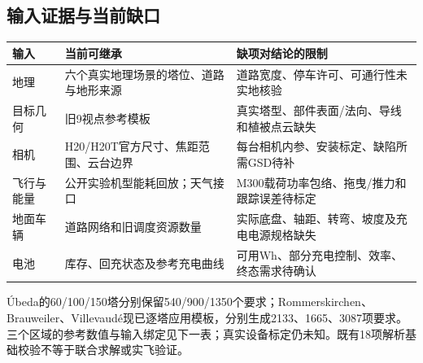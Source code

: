 \subsection{输入证据与当前缺口}
\begin{center}\small
\begin{tabular}{p{.24\linewidth}p{.35\linewidth}p{.31\linewidth}}\toprule
输入 & 当前可继承 & 缺项对结论的限制\\\midrule
地理 & 六个真实地理场景的塔位、道路与地形来源 & 道路宽度、停车许可、可通行性未实地核验\\
目标几何 & 旧9视点参考模板 & 真实塔型、部件表面/法向、导线和植被点云缺失\\
相机 & H20/H20T官方尺寸、焦距范围、云台边界 & 每台相机内参、安装标定、缺陷所需GSD待补\\
飞行与能量 & 公开实验机型能耗回放；天气接口 & M300载荷功率包络、拖曳/推力和跟踪误差待标定\\
地面车辆 & 道路网络和旧调度资源数量 & 实际底盘、轴距、转弯、坡度及充电电源规格缺失\\
电池 & 库存、回充状态及参考充电曲线 & 可用Wh、部分充电控制、效率、终态需求待确认\\\bottomrule
\end{tabular}
\end{center}

\noindent Úbeda的60/100/150塔分别保留540/900/1350个要求；Rommerskirchen、Brauweiler、Villevaudé现已逐塔应用模板，分别生成2133、1665、3087项要求。三个区域的参考数值与输入绑定见下一表；真实设备标定仍未知。既有18项解析基础校验不等于联合求解或实飞验证。

\clearpage
